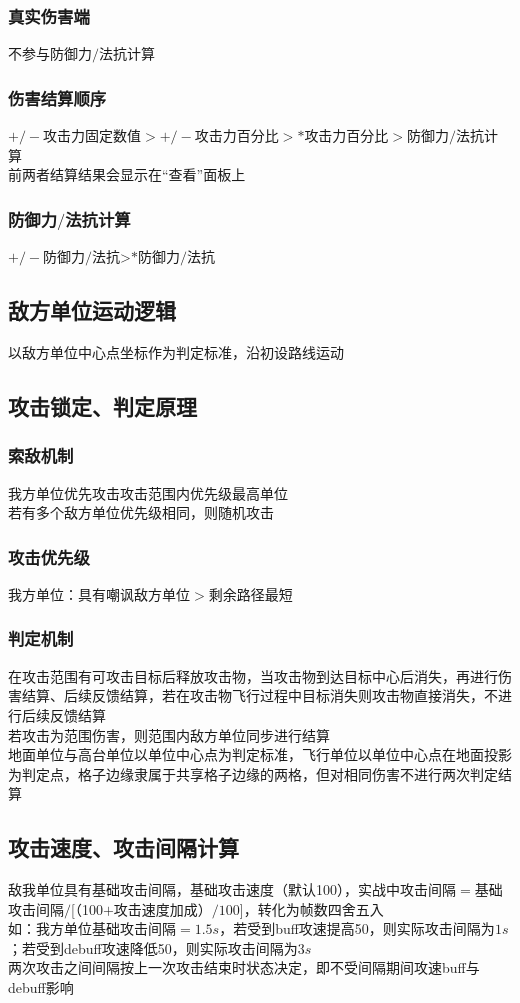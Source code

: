 \documentclass[a4paper, 12pt]{article}
\begin{document}
			\subsubsection{真实伤害端}
				不参与防御力$/$法抗计算
			\subsubsection{伤害结算顺序}
				$+/-$攻击力固定数值$>+/-$攻击力百分比$>*$攻击力百分比$>$防御力$/$法抗计算\\
				\indent 前两者结算结果会显示在“查看”面板上
			\subsubsection{防御力$/$法抗计算}
				$+/-$防御力$/$法抗>$*$防御力$/$法抗
		\subsection{敌方单位运动逻辑}
			以敌方单位中心点坐标作为判定标准，沿初设路线运动
		\subsection{攻击锁定、判定原理}
			\subsubsection{索敌机制}
				我方单位优先攻击攻击范围内优先级最高单位\\
				\indent 若有多个敌方单位优先级相同，则随机攻击\\
			\subsubsection{攻击优先级}
				我方单位：具有嘲讽敌方单位$>$剩余路径最短\\
			\subsubsection{判定机制}
				在攻击范围有可攻击目标后释放攻击物，当攻击物到达目标中心后消失，再进行伤害结算、后续反馈结算，若在攻击物飞行过程中目标消失则攻击物直接消失，不进行后续反馈结算\\
				\indent 若攻击为范围伤害，则范围内敌方单位同步进行结算\\
				\indent 地面单位与高台单位以单位中心点为判定标准，飞行单位以单位中心点在地面投影为判定点，格子边缘隶属于共享格子边缘的两格，但对相同伤害不进行两次判定结算
		\subsection{攻击速度、攻击间隔计算}
			敌我单位具有基础攻击间隔，基础攻击速度（默认100），实战中攻击间隔$=$基础攻击间隔$/$[（100$+$攻击速度加成）$/100$]，转化为帧数四舍五入\\
			\indent 如：我方单位基础攻击间隔$=1.5s$，若受到buff攻速提高50，则实际攻击间隔为$1s$；若受到debuff攻速降低50，则实际攻击间隔为$3s$\\
			\indent 两次攻击之间间隔按上一次攻击结束时状态决定，即不受间隔期间攻速buff与debuff影响
\end{document}
